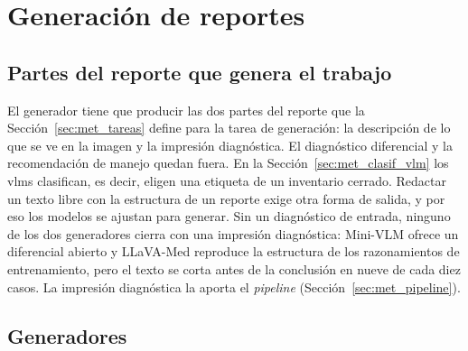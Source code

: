 \section{Generación de reportes}
\label{sec:met_generacion}


\subsection{Partes del reporte que genera el trabajo}

El generador tiene que producir las dos partes del reporte que la Sección~\ref{sec:met_tareas} define para la tarea
de generación: la descripción de lo que se ve en la imagen y la impresión diagnóstica. El diagnóstico diferencial y
la recomendación de manejo quedan fuera. En la Sección~\ref{sec:met_clasif_vlm} los \glspl{vlm} clasifican, es decir,
eligen una etiqueta de un inventario cerrado. Redactar un texto libre con la estructura de un reporte exige otra forma
de salida, y por eso los modelos se ajustan para generar.
Sin un diagnóstico de entrada, ninguno de los dos generadores cierra con una impresión diagnóstica: Mini-VLM ofrece
un diferencial abierto y LLaVA-Med reproduce la estructura de los razonamientos de entrenamiento, pero el texto se
corta antes de la conclusión en nueve de cada diez casos. La impresión diagnóstica la aporta el \emph{pipeline}
(Sección~\ref{sec:met_pipeline}).

\subsection{Generadores}

